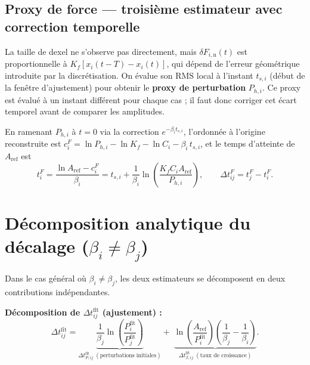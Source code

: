 \documentclass[11pt,a4paper]{article}
\newcommand{\dFin}{\delta F_{i,\mathrm{n}}}
\newcommand{\betai}{\beta_i}
\newcommand{\Pproxy}{P_{h,i}}
\newcommand{\cFi}{c_i^{F}}
\newcommand{\Aref}{A_{\mathrm{ref}}}
\newcommand{\tF}{t_i^{F}}
\newcommand{\Dtfit}{\Delta t_{ij}^{\mathrm{fit}}}
\newcommand{\DtF}{\Delta t_{ij}^{F}}
\newcommand{\DtPfit}{\Delta t_{P,ij}^{\mathrm{fit}}}
\newcommand{\Dtbfit}{\Delta t_{\beta,ij}^{\mathrm{fit}}}
\newcommand{\RMS}{\operatorname{RMS}}
\newcommand{\Kf}{K_f}
\begin{document}
\subsection{Proxy de force — troisième estimateur avec correction temporelle}

La taille de dexel ne s'observe pas directement, mais $\dFin(t)$ est
proportionnelle à $\Kf[x_i(t-T)-x_i(t)]$, qui dépend de l'erreur géométrique
introduite par la discrétisation. On évalue son RMS local à l'instant $t_{s,i}$
(début de la fenêtre d'ajustement) pour obtenir le \textbf{proxy de perturbation}
$\Pproxy$. Ce proxy est évalué à un instant différent pour chaque cas ; il faut
donc corriger cet écart temporel avant de comparer les amplitudes.




En ramenant $\Pproxy$ à $t=0$ via la correction $e^{-\betai t_{s,i}}$, l'ordonnée à l'origine reconstruite est
$\cFi = \ln\Pproxy - \ln\Kf - \ln C_i - \betai\,t_{s,i}$,
et le temps d'atteinte de $\Aref$ est
\begin{equation}\label{eq:tF}
  \tF = \frac{\ln\Aref - \cFi}{\betai}
      = t_{s,i} + \frac{1}{\betai}\ln\!\left(\frac{\Kf C_i \Aref}{\Pproxy}\right),
  \qquad \DtF = t_j^F - \tF.
\end{equation}

\section{Décomposition analytique du décalage \texorpdfstring{($\betai \neq \beta_j$)}{beta i != beta j}}

Dans le cas général où $\betai \neq \beta_j$, les deux estimateurs se
décomposent en deux contributions indépendantes.

\textbf{Décomposition de $\Dtfit$ (ajustement) :}
\begin{equation}\label{eq:decomp-fit}
  \Dtfit
  = \underbrace{\frac{1}{\beta_j}\ln\!\left(\frac{P_i^{\mathrm{fit}}}{P_j^{\mathrm{fit}}}\right)}_{\DtPfit
    \;(\text{perturbations initiales})}
  +\; \underbrace{\ln\!\left(\frac{\Aref}{P_i^{\mathrm{fit}}}\right)
    \!\left(\frac{1}{\beta_j} - \frac{1}{\betai}\right)}_{\Dtbfit
    \;(\text{taux de croissance})}.
\end{equation}
\end{document}
